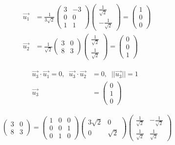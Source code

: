 \begin{align}
    \Vec{u_1} &= \frac{1}{3\sqrt{2}} \begin{pmatrix}
        3 & -3 \\ 0 & 0 \\ 1 & 1
    \end{pmatrix} \begin{pmatrix}
        \frac{1}{\sqrt{2}} \\ -\frac{1}{\sqrt{2}}
    \end{pmatrix} = \begin{pmatrix}
        1 \\ 0 \\ 0
    \end{pmatrix} \\
    \Vec{u_2} &= \frac{1}{\sqrt{2}} \begin{pmatrix}
        3 & 0 \\ 8 & 3
    \end{pmatrix} \begin{pmatrix}
        \frac{1}{\sqrt{2}} \\ \frac{1}{\sqrt{2}}
    \end{pmatrix} = \begin{pmatrix}
        0 \\ 0 \\ 1
    \end{pmatrix}
\end{align}

\begin{align}
    \Vec{u_3} \cdot \Vec{u_1} = 0, \;\; \Vec{u_3} \cdot \Vec{u_2} &= 0, \;\; ||\Vec{u_3}|| = 1 \;\; \\
    \Vec{u_3} &= \begin{pmatrix}
        0 \\ 1 \\ 0
    \end{pmatrix}
\end{align}

\begin{align}
    \begin{pmatrix}
        3 & 0 \\ 8 & 3 
    \end{pmatrix} = \begin{pmatrix}
        1 & 0 & 0 \\ 0 & 0 & 1 \\ 0 & 1 & 0
    \end{pmatrix} \begin{pmatrix}
        3\sqrt{2} & 0 \\ 0 & \sqrt{2}
    \end{pmatrix} \begin{pmatrix}
        \frac{1}{\sqrt{2}} & -\frac{1}{\sqrt{2}} \\
        \frac{1}{\sqrt{2}} & \frac{1}{\sqrt{2}}
    \end{pmatrix}
\end{align}

